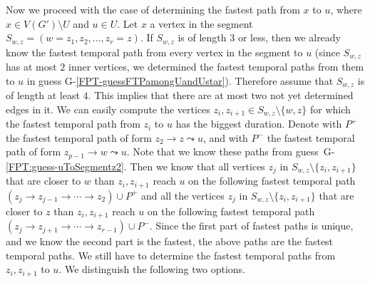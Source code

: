 \documentclass[11pt,a4paper]{article}
\theoremstyle{remark}
\theoremstyle{definition}
\begin{document}
Now we proceed with the case of determining the fastest path from $x$ to $u$, where $x \in V(G') \setminus U$ and $u \in U$.
Let $x$ a vertex in the segment $S_{w,z} = (w=z_1,z_2, \dots, z_r = z)$.
If $S_{w,z}$ is of length $3$ or less, then we already know the fastest temporal path from every vertex in the segment to $u$ 
(since $S_{w,z}$ has at most $2$ inner vertices, we determined the fastest temporal paths from them to $u$ in guess G-\ref{FPT-guessFTPamongUandUstar}).
Therefore assume that $S_{w,z}$ is of length at least $4$.
This implies that there are at most two not yet determined edges in it.
We can easily compute the vertices $z_i, z_{i+1} \in S_{w,z}\setminus\{w,z\}$ for which the fastest temporal path from $z_i$ to $u$ has the biggest duration.
Denote with $P^+$ the fastest temporal path of form $z_2 \rightarrow z \leadsto u$,
and with $P^-$ the fastest temporal path of form $z_{p-1} \rightarrow w \leadsto u$.
Note that we know these paths from guess~G-\ref{FPT:guess-uToSegmentz2}.
Then we know that all vertices $z_j$ in $S_{w,z} \setminus\{z_i,z_{i+1}\}$ that are closer to $w$ than $z_i,z_{i+1}$ reach $u$ on the 
following fastest temporal path $(z_j \rightarrow z_{j-1} \rightarrow \cdots \rightarrow z_2) \cup P^+$ 
and
all the vertices $z_j$ in $S_{w,z}\setminus\{z_i,z_{i+1}\}$ that are closer to $z$ than $z_i, z_{i+1}$ reach $u$ on the 
following fastest temporal path
$(z_j \rightarrow z_{j+1} \rightarrow \cdots \rightarrow z_{r-1}) \cup P^-$.
Since the first part of fastest paths is unique, and we know the second part is the fastest, the above paths are the fastest temporal paths.
We still have to determine the fastest temporal paths from $z_i,z_{i+1}$ to $u$.
We distinguish the following two options.
\end{document}

